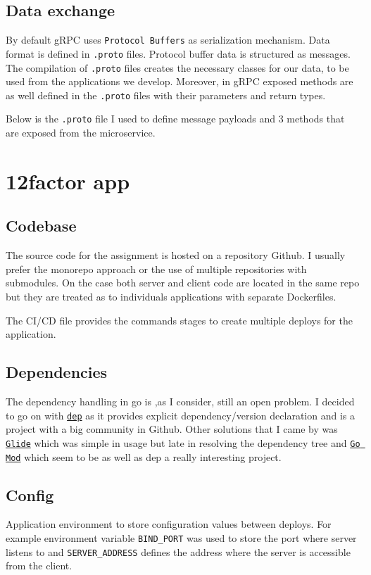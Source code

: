 \documentclass[a4paper,10pt]{article}
\begin{document}
\subsection{Data exchange}
By default gRPC uses \texttt{Protocol Buffers} as serialization mechanism. Data 
format is defined in \texttt{.proto} files. Protocol buffer data is structured as messages. The compilation of \texttt{.proto} files creates the necessary classes 
for our data, to be used from the applications we develop. Moreover, in gRPC exposed 
methods are as well defined in the \texttt{.proto} files with their parameters and 
return types.

Below is the \texttt{.proto} file I used to define message payloads and 3 methods 
that are exposed from the microservice.




\section{12factor app}

\subsection{Codebase}
The source code for the assignment is hosted on a repository Github. I usually prefer
the monorepo approach or the use of multiple repositories with submodules. On the case 
both server and client code are located in the same repo but they are treated as to 
individuals applications with separate Dockerfiles.

The CI/CD file provides the commands stages to create multiple deploys for the application.
\subsection{Dependencies}
The dependency handling in go is ,as I consider, still an open problem. I decided to 
go on with \texttt{\href{https://golang.github.io/dep/}{dep}} as it provides explicit 
dependency/version declaration and is a project with a big community in Github. Other 
solutions that I came by was \texttt{\href{https://glide.sh/}{Glide}} which was simple in 
usage but late in resolving the dependency tree and \texttt{\href{https://blog.golang.org/using-go-modules}{Go Mod}} which seem to be as well as dep a really interesting project.
\subsection{Config}
Application environment to store configuration values between deploys. For example environment variable \texttt{BIND\_PORT} was used to store the port where server listens to   and \texttt{SERVER\_ADDRESS} defines the address where the server is accessible from the client.
\end{document}
